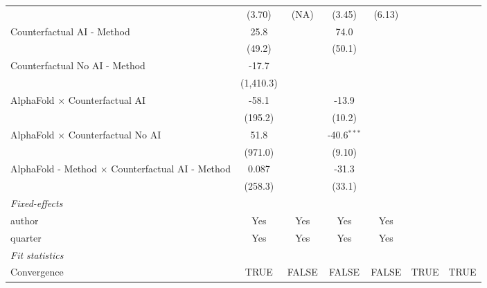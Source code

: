 \begin{tabular}{lcccccc}
                                                           & (3.70)    & (NA)                   & (3.45)        & (6.13)       &      &   \\   
   Counterfactual AI - Method                              & 25.8      &                        & 74.0          &              &      &   \\   
                                                           & (49.2)    &                        & (50.1)        &              &      &   \\   
   Counterfactual No AI - Method                           & -17.7     &                        &               &              &      &   \\   
                                                           & (1,410.3) &                        &               &              &      &   \\   
   AlphaFold $\times$ Counterfactual AI                    & -58.1     &                        & -13.9         &              &      &   \\   
                                                           & (195.2)   &                        & (10.2)        &              &      &   \\   
   AlphaFold $\times$ Counterfactual No AI                 & 51.8      &                        & -40.6$^{***}$ &              &      &   \\   
                                                           & (971.0)   &                        & (9.10)        &              &      &   \\   
   AlphaFold - Method $\times$ Counterfactual AI - Method  & 0.087     &                        & -31.3         &              &      &   \\   
                                                           & (258.3)   &                        & (33.1)        &              &      &   \\   
   \midrule
   \emph{Fixed-effects}\\
   author                                                  & Yes       & Yes                    & Yes           & Yes          &      & \\  
   quarter                                                 & Yes       & Yes                    & Yes           & Yes          &      & \\  
   \midrule
   \emph{Fit statistics}\\
   Convergence                                             &TRUE       & FALSE                  & FALSE         & FALSE        & TRUE & TRUE\\  

\end{tabular}
